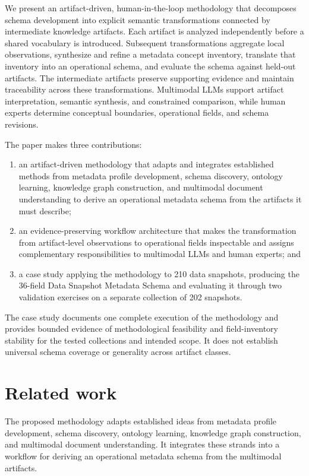 \documentclass{article}
\begin{document}
We present an artifact-driven, human-in-the-loop methodology that decomposes schema development into explicit semantic transformations connected by intermediate knowledge artifacts. Each artifact is analyzed independently before a shared vocabulary is introduced. Subsequent transformations aggregate local observations, synthesize and refine a metadata concept inventory, translate that inventory into an operational schema, and evaluate the schema against held-out artifacts. The intermediate artifacts preserve supporting evidence and maintain traceability across these transformations. Multimodal LLMs support artifact interpretation, semantic synthesis, and constrained comparison, while human experts determine conceptual boundaries, operational fields, and schema revisions.

The paper makes three contributions:

\begin{enumerate}
    \item an artifact-driven methodology that adapts and integrates established methods from metadata profile development, schema discovery, ontology learning, knowledge graph construction, and multimodal document understanding to derive an operational metadata schema from the artifacts it must describe;
    \item an evidence-preserving workflow architecture that makes the transformation from artifact-level observations to operational fields inspectable and assigns complementary responsibilities to multimodal LLMs and human experts; and
    \item a case study applying the methodology to 210 data snapshots, producing the 36-field Data Snapshot Metadata Schema and evaluating it through two validation exercises on a separate collection of 202 snapshots.
\end{enumerate}

The case study documents one complete execution of the methodology and provides bounded evidence of methodological feasibility and field-inventory stability for the tested collections and intended scope. It does not establish universal schema coverage or generality across artifact classes.

\section{Related work}

The proposed methodology adapts established ideas from metadata profile development, schema discovery, ontology learning, knowledge graph construction, and multimodal document understanding. It integrates these strands into a workflow for deriving an operational metadata schema from the multimodal artifacts.
\end{document}
